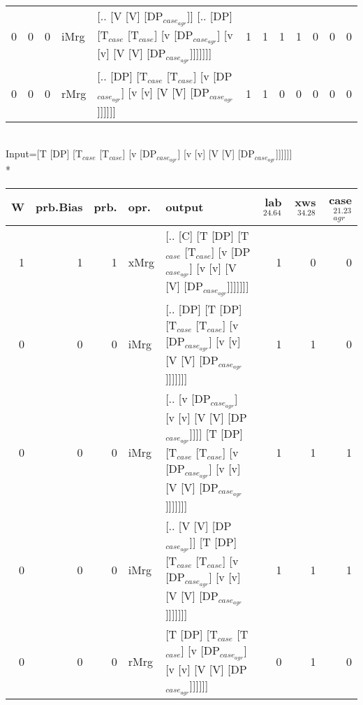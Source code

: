 \begin{tabularx}{\linewidth}{rrrlXrrrrrrr}
   0 &       0 &   0 & iMrg & [.. [V [V] [DP$_{case_{agr}}$]] [.. [DP] [T$_{case}$ [T$_{case}$] [v [DP$_{case_{agr}}$] [v [v] [V [V] [DP$_{case_{agr}}$]]]]]]]                                             &             1 &             1 &                  1 &            1 &              0 &               0 &              0 \\
   0 &       0 &   0 & rMrg & [.. [DP] [T$_{case}$ [T$_{case}$] [v [DP$_{case_{agr}}$] [v [v] [V [V] [DP$_{case_{agr}}$]]]]]]                                                                        &             1 &             1 &                  0 &            0 &              0 &               0 &              0 \\
\hline
\end{tabularx}\endgroup\\
\begingroup\scriptsize Input=[T [DP] [T$_{case}$ [T$_{case}$] [v [DP$_{case_{agr}}$] [v [v] [V [V] [DP$_{case_{agr}}$]]]]]]\\*
\begin{tabularx}{\linewidth}{rrrlXrrr}
\hline
   W &   prb.Bias &   prb. & opr.   & output                                                                                                                          &   lab$^{24.64}$ &   xws$^{34.28}$ &   case$_{agr}^{21.23}$ \\
\hline
   1 &       1 &   1 & xMrg & [.. [C] [T [DP] [T$_{case}$ [T$_{case}$] [v [DP$_{case_{agr}}$] [v [v] [V [V] [DP$_{case_{agr}}$]]]]]]]                                             &             1 &             0 &                  0 \\
   0 &       0 &   0 & iMrg & [.. [DP] [T [DP] [T$_{case}$ [T$_{case}$] [v [DP$_{case_{agr}}$] [v [v] [V [V] [DP$_{case_{agr}}$]]]]]]]                                            &             1 &             1 &                  0 \\
   0 &       0 &   0 & iMrg & [.. [v [DP$_{case_{agr}}$] [v [v] [V [V] [DP$_{case_{agr}}$]]]] [T [DP] [T$_{case}$ [T$_{case}$] [v [DP$_{case_{agr}}$] [v [v] [V [V] [DP$_{case_{agr}}$]]]]]]] &             1 &             1 &                  1 \\
   0 &       0 &   0 & iMrg & [.. [V [V] [DP$_{case_{agr}}$]] [T [DP] [T$_{case}$ [T$_{case}$] [v [DP$_{case_{agr}}$] [v [v] [V [V] [DP$_{case_{agr}}$]]]]]]]                           &             1 &             1 &                  1 \\
   0 &       0 &   0 & rMrg & [T [DP] [T$_{case}$ [T$_{case}$] [v [DP$_{case_{agr}}$] [v [v] [V [V] [DP$_{case_{agr}}$]]]]]]                                                      &             0 &             1 &                  0 \\
\hline
\end{tabularx}\endgroup\\
